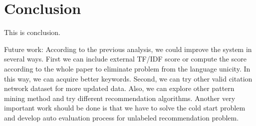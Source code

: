 \section{Conclusion} \label{sec:conclusion}

This is conclusion.

Future work:
According to the previous analysis, we could improve the system in several ways. First we can include external TF/IDF score or compute the score according to the whole paper to eliminate problem from the language unicity. In this way, we can acquire better keywords. Second, we can try other valid citation network dataset for more updated data. Also, we can explore other pattern mining method and try different recommendation algorithms. Another very important work should be done is that we have to solve the cold start problem and develop auto evaluation process for unlabeled recommendation problem. 